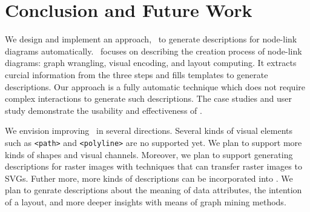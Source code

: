 \section{Conclusion and Future Work}
We design and implement an approach, \ApproachName~to generate descriptions for node-link diagrams automatically.
\ApproachName~focuses on describing the creation process of node-link diagrams: graph wrangling, visual encoding, and layout computing.
It extracts curcial information from the three steps and fills templates to generate descriptions.
Our approach is a fully automatic technique which does not require complex interactions to generate such descriptions.
The case studies and user study demonstrate the usability and effectiveness of \ApproachName.

We envision improving \ApproachName~in several directions.
Several kinds of visual elements such as \texttt{<path>} and \texttt{<polyline>} are no supported yet.
We plan to support more kinds of shapes and visual channels.
Moreover, we plan to support generating descriptions for raster images with techniques that can transfer raster images to SVGs.
Futher more, more kinds of descriptions can be incorporated into \ApproachName.
We plan to genrate descriptions about the meaning of data attributes, the intention of a layout, and more deeper insights with means of graph mining methods.